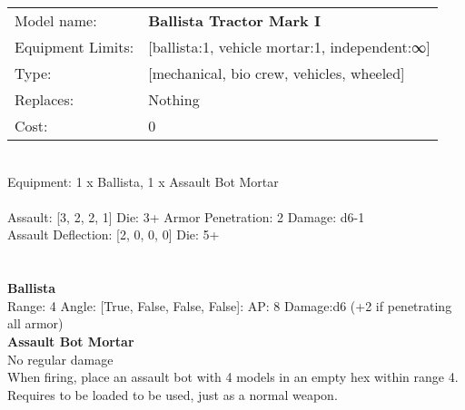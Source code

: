 \noindent
\begin{tabular}{ll}
Model name: &{\bf Ballista Tractor Mark I } \\
Equipment Limits: &[ballista:1, vehicle mortar:1, independent:∞] \\
Type: &[mechanical, bio crew, vehicles, wheeled] \\
Replaces: &Nothing \\
Cost: & 0\\
\end{tabular}
\ \\
Equipment: 1 x Ballista, 1 x Assault Bot Mortar \\
\ \\
Assault: [3, 2, 2, 1] Die: 3+ Armor Penetration: 2 Damage: d6-1 \\
Assault Deflection: [2, 0, 0, 0] Die: 5+\\
\indent  
\ \\

\ \\
{\bf Ballista } \\



Range: 4  Angle: [True, False, False, False]: AP: 8 Damage:d6 (+2 if penetrating all armor) \\




{\bf Assault Bot Mortar } \\

No regular damage\\ 
When firing, place an assault bot with 4 models in an empty hex within range 4. Requires to be loaded to be used, just as a normal weapon.\\ 





 
\ \\



